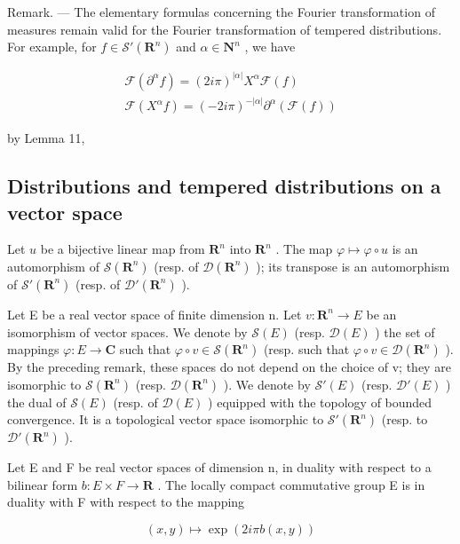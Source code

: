 Remark. --- The elementary formulas concerning the Fourier transformation of measures remain valid for the Fourier transformation of tempered distributions. For example, for \(f \in \mathcal{S}'(\mathbf{R}^{n})\) and \(\alpha \in \mathbf{N}^{n}\) , we have

\[
\begin{array}{l} \mathcal {F} (\partial^ {\alpha} f) = (2 i \pi) ^ {| \alpha |} X ^ {\alpha} \mathcal {F} (f) \\ \mathcal {F} (X ^ {\alpha} f) = (- 2 i \pi) ^ {- | \alpha |} \partial^ {\alpha} (\mathcal {F} (f)) \end{array}
\]

by Lemma 11,

\subsection{Distributions and tempered distributions on a vector space}

Let \(u\) be a bijective linear map from \(\mathbf{R}^{n}\) into \(\mathbf{R}^{n}\) . The map \(\varphi \mapsto \varphi \circ u\) is an automorphism of \(\mathcal{S}(\mathbf{R}^{n})\) (resp. of \(\mathcal{D}(\mathbf{R}^{n})\) ); its transpose is an automorphism of \(\mathcal{S}'(\mathbf{R}^{n})\) (resp. of \(\mathcal{D}'(\mathbf{R}^{n})\) ).

Let E be a real vector space of finite dimension n. Let \(v: \mathbf{R}^{n} \to E\) be an isomorphism of vector spaces. We denote by \(\mathcal{S}(E)\) (resp. \(\mathcal{D}(E)\) ) the set of mappings \(\varphi: E \to \mathbf{C}\) such that \(\varphi \circ v \in \mathcal{S}(\mathbf{R}^{n})\) (resp. such that \(\varphi \circ v \in \mathcal{D}(\mathbf{R}^{n})\) ). By the preceding remark, these spaces do not depend on the choice of v; they are isomorphic to \(\mathcal{S}(\mathbf{R}^{n})\) (resp. \(\mathcal{D}(\mathbf{R}^{n})\) ). We denote by \(\mathcal{S}'(E)\) (resp. \(\mathcal{D}'(E)\) ) the dual of \(\mathcal{S}(E)\) (resp. of \(\mathcal{D}(E)\) ) equipped with the topology of bounded convergence. It is a topological vector space isomorphic to \(\mathcal{S}'(\mathbf{R}^{n})\) (resp. to \(\mathcal{D}'(\mathbf{R}^{n})\) ).

Let E and F be real vector spaces of dimension n, in duality with respect to a bilinear form \(b: E \times F \to \mathbf{R}\) . The locally compact commutative group E is in duality with F with respect to the mapping

\[
(x, y) \mapsto \exp (2 i \pi b (x, y))
\]

